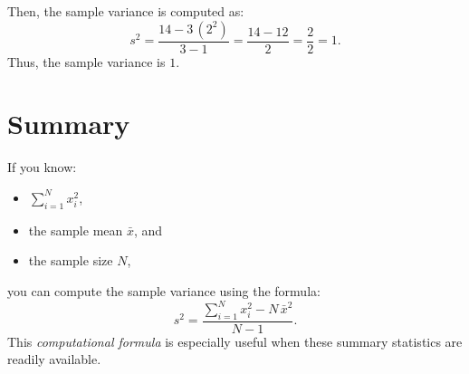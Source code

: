 \documentclass[12pt]{article}
\begin{document}
Then, the sample variance is computed as:
\[
s^2 = \frac{14 - 3\,(2^2)}{3-1}
= \frac{14 - 12}{2}
= \frac{2}{2} = 1.
\]
Thus, the sample variance is \(1\).

\section{Summary}
If you know:
\begin{itemize}
    \item \(\sum_{i=1}^{N} x_i^2\),
    \item the sample mean \(\bar{x}\), and
    \item the sample size \(N\),
\end{itemize}
you can compute the sample variance using the formula:
\[
s^2 = \frac{\sum_{i=1}^{N} x_i^2 - N\,\bar{x}^2}{N-1}.
\]
This \emph{computational formula} is especially useful when these summary statistics are readily available.
\end{document}
